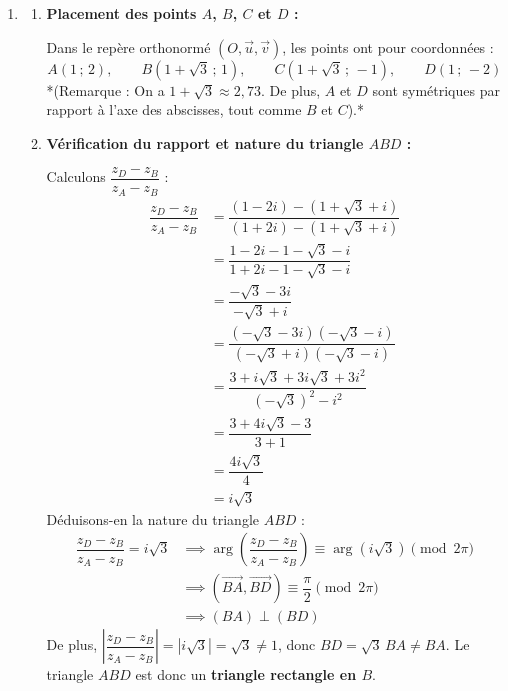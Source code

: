 \documentclass[12pt,a4paper]{article}
\begin{document}
\begin{enumerate}
    \item 
    \begin{enumerate}
        \item \textbf{Placement des points $A$, $B$, $C$ et $D$ :}
        
        Dans le repère orthonormé $(O, \vec{u}, \vec{v})$, les points ont pour coordonnées :
        $$
        A(1 \,;\, 2), \qquad B(1 + \sqrt{3} \,;\, 1), \qquad C(1 + \sqrt{3} \,;\, -1), \qquad D(1 \,;\, -2)
        $$
        *(Remarque : On a $1 + \sqrt{3} \approx 2{,}73$. De plus, $A$ et $D$ sont symétriques par rapport à l'axe des abscisses, tout comme $B$ et $C$).*

        \item \textbf{Vérification du rapport et nature du triangle $ABD$ :}
        
        Calculons $\dfrac{z_D - z_B}{z_A - z_B}$ :
        $$
        \begin{aligned}
            \dfrac{z_D - z_B}{z_A - z_B} &= \dfrac{(1 - 2i) - (1 + \sqrt{3} + i)}{(1 + 2i) - (1 + \sqrt{3} + i)} \\
            &= \dfrac{1 - 2i - 1 - \sqrt{3} - i}{1 + 2i - 1 - \sqrt{3} - i} \\
            &= \dfrac{-\sqrt{3} - 3i}{-\sqrt{3} + i} \\
            &= \dfrac{(-\sqrt{3} - 3i)(-\sqrt{3} - i)}{(-\sqrt{3} + i)(-\sqrt{3} - i)} \\
            &= \dfrac{3 + i\sqrt{3} + 3i\sqrt{3} + 3i^2}{(-\sqrt{3})^2 - i^2} \\
            &= \dfrac{3 + 4i\sqrt{3} - 3}{3 + 1} \\
            &= \dfrac{4i\sqrt{3}}{4} \\
            &= i\sqrt{3}
        \end{aligned}
        $$
        Déduisons-en la nature du triangle $ABD$ :
        $$
        \begin{aligned}
            \dfrac{z_D - z_B}{z_A - z_B} = i\sqrt{3} &\implies \arg\left(\dfrac{z_D - z_B}{z_A - z_B}\right) \equiv \arg(i\sqrt{3}) \pmod{2\pi} \\
            &\implies \left(\overrightarrow{BA}, \overrightarrow{BD}\right) \equiv \dfrac{\pi}{2} \pmod{2\pi} \\
            &\implies (BA) \perp (BD)
        \end{aligned}
        $$
        De plus, $\left|\dfrac{z_D - z_B}{z_A - z_B}\right| = |i\sqrt{3}| = \sqrt{3} \neq 1$, donc $BD = \sqrt{3}\,BA \neq BA$. Le triangle $ABD$ est donc un \textbf{triangle rectangle en $B$}.


\end{enumerate}
\end{enumerate}
\end{document}
